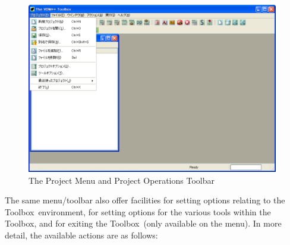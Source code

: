 \documentclass[\pformat,12pt]{article}
\newcommand{\Toolbox}{Toolbox}
\begin{document}
\begin{figure}[tbh]
\begin{center}
\mbox{}
\includegraphics[width=11cm]{projectMenuToolbar-pp.png}
\caption{The Project Menu and Project Operations Toolbar}
\label{fig:projectMenuToolbar}
\end{center}
\end{figure}

The same menu/toolbar also offer facilities for setting options
relating to the \Toolbox\ environment, for setting options for the
various tools within the \Toolbox, and for exiting the \Toolbox\
(only available on the menu). In more  detail, the available actions
are as follows:
\end{document}
